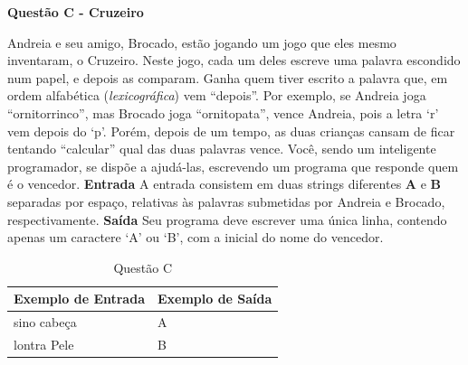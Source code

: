 \documentclass[a4paper, 12pt]{article}
\begin{document}
\newpage %
\begin{center}
\textbf{{\Large Questão C - Cruzeiro}}
\end{center}
\vspace{5pt}
Andreia e seu amigo, Brocado, estão jogando um jogo que eles mesmo
inventaram, o Cruzeiro. Neste jogo, cada um deles escreve uma palavra
escondido num papel, e depois as comparam. Ganha quem tiver escrito a
palavra que, em ordem alfabética (\textit{lexicográfica}) vem ``depois''.
\newline \newline
Por exemplo, se Andreia joga ``ornitorrinco'', mas Brocado joga ``ornitopata'',
vence Andreia, pois a letra ‘r’ vem depois do ‘p’.
\newline \newline
Porém, depois de um tempo, as duas crianças cansam de ficar tentando
``calcular'' qual das duas palavras vence. Você, sendo um inteligente
programador, se dispõe a ajudá-las, escrevendo um programa que responde quem é o vencedor. 
\newline \newline
\textbf{{\large Entrada}} \newline
A entrada consistem em duas strings diferentes \textbf{A} e \textbf{B} separadas por espaço,
relativas às palavras submetidas por Andreia e Brocado, respectivamente.
\newline \newline
\textbf{{\large Saída}} \newline
Seu programa deve escrever uma única linha, contendo apenas um caractere
‘A’ ou ‘B’, com a inicial do nome do vencedor.
\newline
\begin{table}[H]
	\centering
	\begin{tabular}{|l|l|}
\hline
\textbf{Exemplo de Entrada} & \textbf{Exemplo de Saída} \\ \hline
sino cabeça                 & A                         \\ \hline
lontra Pele                 & B                         \\ \hline
\end{tabular}
	\caption{Questão C}
	\label{tabela3}
\end{table}
\end{document}

